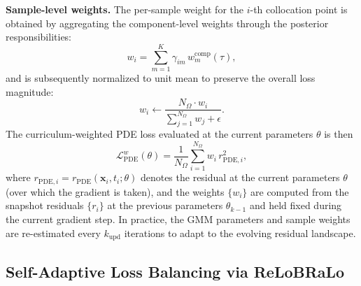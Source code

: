 \documentclass{article}
\theoremstyle{plain}
\theoremstyle{definition}
\theoremstyle{remark}
\begin{document}
	\textbf{Sample-level weights.}\;
	The per-sample weight for the $i$-th collocation point is obtained by
	aggregating the component-level weights through the posterior
	responsibilities:
	\begin{equation}
		w_i = \sum_{m=1}^{K}\gamma_{im}\,w_m^{\mathrm{comp}}(\tau),
		\label{eq:sample_weight}
	\end{equation}
	and is subsequently normalized to unit mean to preserve the overall
	loss magnitude:
	\begin{equation}
		w_i \leftarrow
		\frac{N_\Omega\cdot w_i}
		{\sum_{j=1}^{N_\Omega}w_j + \epsilon}.
		\label{eq:weight_normalize}
	\end{equation}
	The curriculum-weighted PDE loss evaluated at the current parameters $\theta$ is then
	\begin{equation}
		\mathcal{L}_{\mathrm{PDE}}^{w}(\theta)
		= \frac{1}{N_\Omega}\sum_{i=1}^{N_\Omega}
		w_i\,r_{\mathrm{PDE},i}^{2},
		\label{eq:weighted_pde_loss}
	\end{equation}
	where $r_{\mathrm{PDE},i}=r_{\mathrm{PDE}}(\boldsymbol{x}_i,t_i;\theta)$
	denotes the residual at the current parameters $\theta$
	(over which the gradient is taken), and the weights $\{w_i\}$ are
	computed from the snapshot residuals $\{r_i\}$ at the previous
	parameters $\theta_{k-1}$ and held fixed during the current gradient step.
	In practice, the GMM parameters and sample weights are re-estimated
	every $k_{\mathrm{upd}}$ iterations to adapt to the evolving residual
	landscape.
	
	\subsection{Self-Adaptive Loss Balancing via ReLoBRaLo}
	
\end{document}
